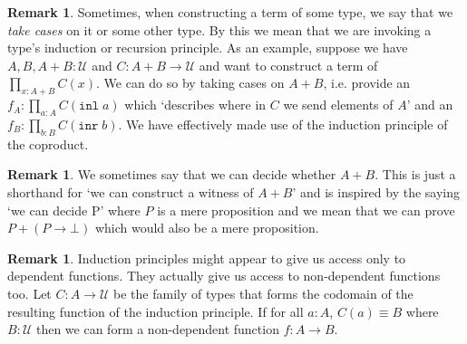 \documentclass[12pt]{report}
\theoremstyle{definition}
\newtheorem{rem}[thm]{Remark}
\begin{document}
\begin{rem}
Sometimes, when constructing a term of some type, we say that we \textit{take cases} on it or some other type. 
By this we mean that we are invoking a type's induction or recursion principle. 
As an example, suppose we have $A, B, A+B : \mathcal{U}$ and $C : A +B \rightarrow \mathcal{U}$ and want to construct a term of $\prod_{x :A+B} C(x)$. 
We can do so by taking cases on $A+B$, i.e. provide an $f_A : \prod_{a :A}C(\mathtt{inl}\; a)$ which `describes where in $C$ we send elements of $A$' and an $f_B : \prod_{b :B}C(\mathtt{inr}\; b)$. 
We have effectively made use of the induction principle of the coproduct. 
\end{rem}
\begin{rem}
We sometimes say that we can decide whether $A+B$. 
This is just a shorthand for `we can construct a witness of $A+B$' and is inspired by the saying `we can decide P' where $P$ is a mere proposition and we mean that we can prove $P + (P \rightarrow \bot)$ which would also be a mere proposition. 
\end{rem}
\begin{rem}
Induction principles might appear to give us access only to dependent functions. 
They actually give us access to non-dependent functions too. 
Let $C : A \rightarrow \mathcal{U}$ be the family of types that forms the codomain of the resulting function of the induction principle. 
If for all $a : A$, $C(a) \equiv B$ where $B  :\mathcal{U}$ then we can form a non-dependent function $f : A \rightarrow B$. 
\end{rem}
\end{document}
